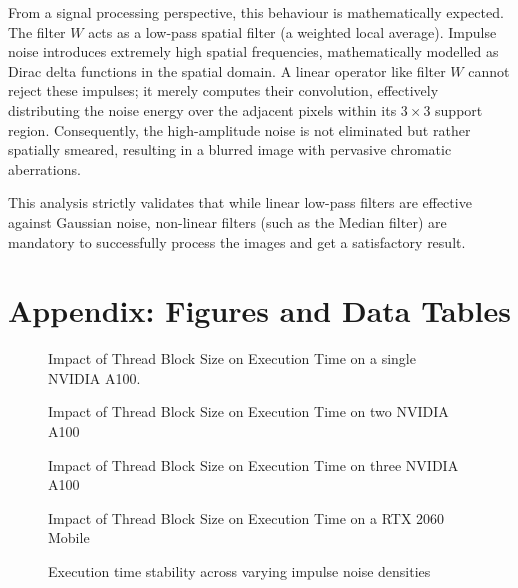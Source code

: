 \documentclass[conference]{IEEEtran}
\numberwithin{figure}{section}
\numberwithin{table}{section}
\begin{document}
From a signal processing perspective, this behaviour is mathematically expected. The filter $W$ acts as a low-pass spatial filter (a weighted local average). Impulse noise introduces extremely high spatial frequencies, mathematically modelled as Dirac delta functions in the spatial domain. A linear operator like filter $W$ cannot reject these impulses; it merely computes their convolution, effectively distributing the noise energy over the adjacent pixels within its $3\times3$ support region. Consequently, the high-amplitude noise is not eliminated but rather spatially smeared, resulting in a blurred image with pervasive chromatic aberrations. 

This analysis strictly validates that while linear low-pass filters are effective against Gaussian noise, non-linear filters (such as the Median filter) are mandatory to successfully process the images and get a satisfactory result.

\section*{Appendix: Figures and Data Tables}

\begin{figure}[htbp]
    
    \caption{Impact of Thread Block Size on Execution Time on a single NVIDIA A100.}
    \label{fig:block_size_impact_1}
\end{figure}

\begin{figure}[htbp]
    \centering
    
    \caption{Impact of Thread Block Size on Execution Time on two NVIDIA A100}
    \label{fig:block_size_impact_2}
\end{figure}

\begin{figure}[htbp]
    \centering
    
    \caption{Impact of Thread Block Size on Execution Time on three NVIDIA A100}
    \label{fig:block_size_impact_3}
\end{figure}

\begin{figure}[htbp]
    \centering
    
    \caption{Impact of Thread Block Size on Execution Time on a RTX 2060 Mobile}
    \label{fig:block_size_impact_2060}
\end{figure}
\begin{figure}[htbp]
    
    \caption{Execution time stability across varying impulse noise densities}
    \label{fig:simd_determinism_1}
\end{figure}
\end{document}
